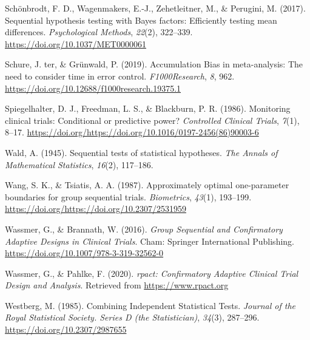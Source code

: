 \documentclass[
  english,
  ,man,floatsintext]{apa6}
\newlength{\cslhangindent}
\newenvironment{cslreferences}%
  {\setlength{\parindent}{0pt}%
  \everypar{\setlength{\hangindent}{\cslhangindent}}\ignorespaces}%
  {\par}
\begin{document}
\begin{cslreferences}
\leavevmode\hypertarget{ref-schonbrodt_sequential_2017}{}%
Schönbrodt, F. D., Wagenmakers, E.-J., Zehetleitner, M., \& Perugini, M. (2017). Sequential hypothesis testing with Bayes factors: Efficiently testing mean differences. \emph{Psychological Methods}, \emph{22}(2), 322--339. \url{https://doi.org/10.1037/MET0000061}

\leavevmode\hypertarget{ref-ter_schure_accumulation_2019}{}%
Schure, J. ter, \& Grünwald, P. (2019). Accumulation Bias in meta-analysis: The need to consider time in error control. \emph{F1000Research}, \emph{8}, 962. \url{https://doi.org/10.12688/f1000research.19375.1}

\leavevmode\hypertarget{ref-spiegelhalter_monitoring_1986}{}%
Spiegelhalter, D. J., Freedman, L. S., \& Blackburn, P. R. (1986). Monitoring clinical trials: Conditional or predictive power? \emph{Controlled Clinical Trials}, \emph{7}(1), 8--17. \url{https://doi.org/https://doi.org/10.1016/0197-2456(86)90003-6}

\leavevmode\hypertarget{ref-wald_sequential_1945}{}%
Wald, A. (1945). Sequential tests of statistical hypotheses. \emph{The Annals of Mathematical Statistics}, \emph{16}(2), 117--186.

\leavevmode\hypertarget{ref-wang_approximately_1987}{}%
Wang, S. K., \& Tsiatis, A. A. (1987). Approximately optimal one-parameter boundaries for group sequential trials. \emph{Biometrics}, \emph{43}(1), 193--199. \url{https://doi.org/https://doi.org/10.2307/2531959}

\leavevmode\hypertarget{ref-wassmer_group_2016}{}%
Wassmer, G., \& Brannath, W. (2016). \emph{Group Sequential and Confirmatory Adaptive Designs in Clinical Trials}. Cham: Springer International Publishing. \url{https://doi.org/10.1007/978-3-319-32562-0}

\leavevmode\hypertarget{ref-wassmer_rpact_2019}{}%
Wassmer, G., \& Pahlke, F. (2020). \emph{rpact: Confirmatory Adaptive Clinical Trial Design and Analysis}. Retrieved from \url{https://www.rpact.org}

\leavevmode\hypertarget{ref-westberg_combining_1985}{}%
Westberg, M. (1985). Combining Independent Statistical Tests. \emph{Journal of the Royal Statistical Society. Series D (the Statistician)}, \emph{34}(3), 287--296. \url{https://doi.org/10.2307/2987655}
\end{cslreferences}

\endgroup
\end{document}
